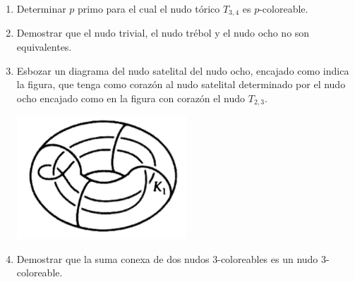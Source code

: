 \documentclass[12pt]{report}
\begin{document}
\begin{enumerate}
\item Determinar $p$ primo para el cual el nudo tórico $T_{3,4}$ es $p$-coloreable. 

\item Demostrar que el nudo trivial, el nudo trébol y el nudo ocho no son equivalentes.

\item Esbozar un diagrama del nudo satelital del nudo ocho, encajado como indica la figura, que tenga como corazón al nudo satelital determinado por el nudo ocho encajado como en la figura con corazón el nudo $T_{2, 3}$.
\begin{center}
\includegraphics[width=0.5\textwidth] {05.png}
\end{center}

\item Demostrar que la suma conexa de dos nudos $3$-coloreables es un nudo $3$-coloreable.
\end{enumerate}
\end{document}

